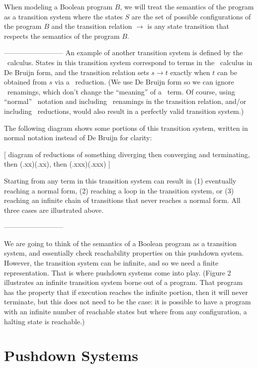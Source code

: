 \documentclass{article}
\begin{document}
When modeling a Boolean program $B$, we will treat the semantics of
the program as a transition system where the states $S$ are the set of
possible configurations of the program $B$ and the transition relation
$\rightarrow$ is any state transition that respects the semantics of
the program $B$.

--------------------------
An example of another transition system is defined by the
\lambda\ calculus. States in this transition system correspond to
terms in the \lambda\ calculus in De Bruijn form, and the transition
relation sets $s \rightarrow t$ exactly when $t$ can be obtained from
$s$ via a \beta\ reduction. (We use De Bruijn form so we can ignore
\alpha\ renamings, which don't change the ``meaning'' of a
\lambda\ term. Of course, using ``normal'' \lambda\ notation and
including \alpha\ renamings in the transition relation, and/or
including \eta\ reductions, would also result in a perfectly valid
transition system.)

The following diagram shows some portions of this transition system,
written in normal notation instead of De Bruijn for clarity:

  [ diagram of reductions of something diverging then converging
    and terminating, then (\x.xx)(\x.xx), then (\x.xxx)(\x.xxx) ]

Starting from any term in this transition system can result in (1)
eventually reaching a normal form, (2) reaching a loop in the
transition system, or (3) reaching an infinite chain of transitions
that never reaches a normal form. All three cases are illustrated
above.

--------------------------

We are going to think of the semantics of a Boolean program as a
transition system, and essentially check reachability properties on
this pushdown system. However, the transition system can be infinite,
and so we need a finite representation. That is where pushdown systems
come into play. (Figure 2 illustrates an infinite transition system
borne out of a program. That program has the property that if
execution reaches the infinite portion, then it will never terminate,
but this does not need to be the case: it is possible to have a
program with an infinite number of reachable states but where from any
configuration, a halting state is reachable.)


\section{Pushdown Systems}
\end{document}
